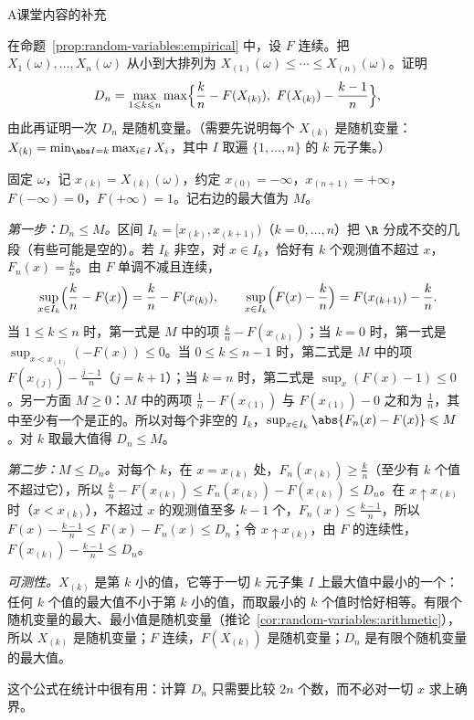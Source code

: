 \begin{exercises}{A}{课堂内容的补充}
\item\label{ex:random-variables:A13} 在命题~\ref{prop:random-variables:empirical} 中，设 $F$ 连续。把 $X_1(\omega),\dots,X_n(\omega)$ 从小到大排列为 $X_{(1)}(\omega)\leqslant\cdots\leqslant X_{(n)}(\omega)$。证明
\[
D_n=\max_{1\leqslant k\leqslant n}\max\Bigl\{\frac kn-F(X_{(k)}),\ F(X_{(k)})-\frac{k-1}n\Bigr\},
\]
由此再证明一次 $D_n$ 是随机变量。（需要先说明每个 $X_{(k)}$ 是随机变量：$X_{(k)}=\min_{\abs I=k}\max_{i\in I}X_i$，其中 $I$ 取遍 $\{1,\dots,n\}$ 的 $k$ 元子集。）
\begin{solution}
固定 $\omega$，记 $x_{(k)}=X_{(k)}(\omega)$，约定 $x_{(0)}=-\infty$，$x_{(n+1)}=+\infty$，$F(-\infty)=0$，$F(+\infty)=1$。记右边的最大值为 $M$。

\emph{第一步：$D_n\leqslant M$。}区间 $I_k=[x_{(k)},x_{(k+1)})$（$k=0,\dots,n$）把 $\R$ 分成不交的几段（有些可能是空的）。若 $I_k$ 非空，对 $x\in I_k$，恰好有 $k$ 个观测值不超过 $x$，$F_n(x)=\frac kn$。由 $F$ 单调不减且连续，
\[
\sup_{x\in I_k}\Bigl(\frac kn-F(x)\Bigr)=\frac kn-F(x_{(k)}),\qquad\sup_{x\in I_k}\Bigl(F(x)-\frac kn\Bigr)=F(x_{(k+1)})-\frac kn .
\]
当 $1\leqslant k\leqslant n$ 时，第一式是 $M$ 中的项 $\frac kn-F(x_{(k)})$；当 $k=0$ 时，第一式是 $\sup_{x<x_{(1)}}(-F(x))\leqslant0$。当 $0\leqslant k\leqslant n-1$ 时，第二式是 $M$ 中的项 $F(x_{(j)})-\frac{j-1}n$（$j=k+1$）；当 $k=n$ 时，第二式是 $\sup_x(F(x)-1)\leqslant0$。另一方面 $M\geqslant0$：$M$ 中的两项 $\frac1n-F(x_{(1)})$ 与 $F(x_{(1)})-0$ 之和为 $\frac1n$，其中至少有一个是正的。所以对每个非空的 $I_k$，$\sup_{x\in I_k}\abs{F_n(x)-F(x)}\leqslant M$。对 $k$ 取最大值得 $D_n\leqslant M$。

\emph{第二步：$M\leqslant D_n$。}对每个 $k$，在 $x=x_{(k)}$ 处，$F_n(x_{(k)})\geqslant\frac kn$（至少有 $k$ 个值不超过它），所以 $\frac kn-F(x_{(k)})\leqslant F_n(x_{(k)})-F(x_{(k)})\leqslant D_n$。在 $x\uparrow x_{(k)}$ 时（$x<x_{(k)}$），不超过 $x$ 的观测值至多 $k-1$ 个，$F_n(x)\leqslant\frac{k-1}n$，所以 $F(x)-\frac{k-1}n\leqslant F(x)-F_n(x)\leqslant D_n$；令 $x\uparrow x_{(k)}$，由 $F$ 的连续性，$F(x_{(k)})-\frac{k-1}n\leqslant D_n$。

\emph{可测性。}$X_{(k)}$ 是第 $k$ 小的值，它等于一切 $k$ 元子集 $I$ 上最大值中最小的一个：任何 $k$ 个值的最大值不小于第 $k$ 小的值，而取最小的 $k$ 个值时恰好相等。有限个随机变量的最大、最小值是随机变量（推论~\ref{cor:random-variables:arithmetic}），所以 $X_{(k)}$ 是随机变量；$F$ 连续，$F(X_{(k)})$ 是随机变量；$D_n$ 是有限个随机变量的最大值。

这个公式在统计中很有用：计算 $D_n$ 只需要比较 $2n$ 个数，而不必对一切 $x$ 求上确界。
\end{solution}


\end{exercises}
